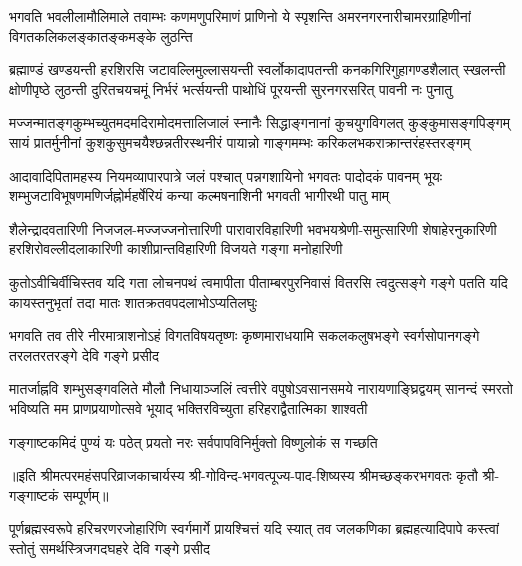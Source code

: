 

\fourlineindentedshloka
{भगवति भवलीलामौलिमाले तवाम्भः}
{कणमणुपरिमाणं प्राणिनो ये स्पृशन्ति}
{अमरनगरनारीचामरग्राहिणीनां}
{विगतकलिकलङ्कातङ्कमङ्के लुठन्ति}%

\fourlineindentedshloka
{ब्रह्माण्डं खण्डयन्ती हरशिरसि जटावल्लिमुल्लासयन्ती}
{स्वर्लोकादापतन्ती कनकगिरिगुहागण्डशैलात् स्खलन्ती}
{क्षोणीपृष्ठे लुठन्ती दुरितचयचमूं निर्भरं भर्त्सयन्ती}
{पाथोधिं पूरयन्ती सुरनगरसरित् पावनी नः पुनातु}%

\fourlineindentedshloka
{मज्जन्मातङ्गकुम्भच्युतमदमदिरामोदमत्तालिजालं}
{स्नानैः सिद्धाङ्गनानां कुचयुगविगलत् कुङ्कुमासङ्गपिङ्गम्}
{सायं प्रातर्मुनीनां कुशकुसुमचयैश्छन्नतीरस्थनीरं}
{पायान्नो गाङ्गमम्भः करिकलभकराक्रान्तरंहस्तरङ्गम्}%

\fourlineindentedshloka
{आदावादिपितामहस्य नियमव्यापारपात्रे जलं}
{पश्चात् पन्नगशायिनो भगवतः पादोदकं पावनम्}
{भूयः शम्भुजटाविभूषणमणिर्जह्नोर्महर्षेरियं}
{कन्या कल्मषनाशिनी भगवती भागीरथी पातु माम्}%

\fourlineindentedshloka
{शैलेन्द्रादवतारिणी निजजल-मज्जज्जनोत्तारिणी}
{पारावारविहारिणी भवभयश्रेणी-समुत्सारिणी}
{शेषाहेरनुकारिणी हरशिरोवल्लीदलाकारिणी}
{काशीप्रान्तविहारिणी विजयते गङ्गा मनोहारिणी}%

\fourlineindentedshloka
{कुतोऽवीचिर्वीचिस्तव यदि गता लोचनपथं}
{त्वमापीता पीताम्बरपुरनिवासं वितरसि}
{त्वदुत्सङ्गे गङ्गे पतति यदि कायस्तनुभृतां}
{तदा मातः शातक्रतवपदलाभोऽप्यतिलघुः}%

\fourlineindentedshloka
{भगवति तव तीरे नीरमात्राशनोऽहं}
{विगतविषयतृष्णः कृष्णमाराधयामि}
{सकलकलुषभङ्गे स्वर्गसोपानगङ्गे}
{तरलतरतरङ्गे देवि गङ्गे प्रसीद}%

\fourlineindentedshloka
{मातर्जाह्नवि शम्भुसङ्गवलिते मौलौ निधायाञ्जलिं}
{त्वत्तीरे वपुषोऽवसानसमये नारायणाङ्घ्रिद्वयम्}
{सानन्दं स्मरतो भविष्यति मम प्राणप्रयाणोत्सवे}
{भूयाद् भक्तिरविच्युता हरिहराद्वैतात्मिका शाश्वती}%

\twolineshloka
{गङ्गाष्टकमिदं पुण्यं यः पठेत् प्रयतो नरः}
{सर्वपापविनिर्मुक्तो विष्णुलोकं स गच्छति}%


॥इति श्रीमत्परमहंसपरिव्राजकाचार्यस्य श्री-गोविन्द-भगवत्पूज्य-पाद-शिष्यस्य
श्रीमच्छङ्करभगवतः कृतौ श्री-गङ्गाष्टकं सम्पूर्णम्॥

{पूर्णब्रह्मस्वरूपे हरिचरणरजोहारिणि स्वर्गमार्गे}
{प्रायश्चित्तं यदि स्यात् तव जलकणिका ब्रह्महत्यादिपापे}
{कस्त्वां स्तोतुं समर्थस्त्रिजगदघहरे देवि गङ्गे प्रसीद}%